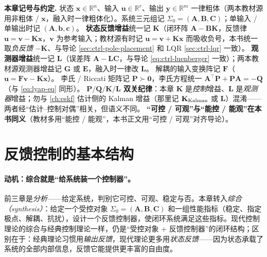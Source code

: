 \begin{note}
\textbf{本章记号与约定.}\;
状态 $\mathbf x\in\mathbb R^n$、输入 $\mathbf u\in\mathbb R^r$、输出 $\mathbf y\in\mathbb R^m$ 一律粗体（两本教材源用非粗体 / $\boldsymbol x$，融入时一律粗体化）。系统三元组记 $\Sigma_0=(\mathbf A,\mathbf B,\mathbf C)$；单输入 / 单输出时记 $(\mathbf A,\mathbf b,\mathbf c)$。
\textbf{状态反馈增益}统一记 $\mathbf K$（闭环阵 $\mathbf A-\mathbf B\mathbf K$，反馈律 $\mathbf u=\mathbf v-\mathbf K\mathbf x$，$\mathbf v$ 为参考输入；教材源有时记 $\mathbf u=\mathbf v+\mathbf K\mathbf x$ 而吸收负号，本书统一取\emph{负反馈} $-\mathbf K$、与导论 \cref{sec:ctrl-pole-placement} 和 LQR \cref{sec:ctrl-lqr} 一致）。
\textbf{观测器增益}统一记 $\mathbf L$（误差阵 $\mathbf A-\mathbf L\mathbf C$，与导论 \cref{eq:ctrl-luenberger} 一致）；两本教材源观测器增益记 $\mathbf G$ 或 $\mathbf E$，融入时一律改 $\mathbf L$。
解耦的输入变换阵记 $\mathbf F$（$\mathbf u=\mathbf F\mathbf v-\mathbf K\mathbf x$）。
李氏 / Riccati 矩阵记 $\mathbf P\succ\mathbf 0$，李氏方程统一 $\mathbf A^\top\mathbf P+\mathbf P\mathbf A=-\mathbf Q$（与 \cref{eq:lyap-eq} 同形）。
\textbf{$\mathbf P/\mathbf Q/\mathbf K/\mathbf L$ 双关纪律}：本章 $\mathbf K$ 是\emph{控制}增益、$\mathbf L$ 是\emph{观测器}增益；勿与 \cref{ch:eskf} 估计侧的 Kalman 增益（那里记 $\mathbf K_{\rm Kalman}$ 或 $\mathbf L$）混淆——两者经“估计--控制对偶”相关，但语义不同。
\textbf{“可控 / 可观”与“能控 / 能观”在本书同义}（教材多用“能控 / 能观”，本书正文用“可控 / 可观”对齐导论）。
\end{note}

\section{反馈控制的基本结构}
\label{sec:syn-feedback}

\paragraph{动机：综合就是“给系统装一个控制器”。}
前三章是\emph{分析}——给定系统，判别它可控、可观、稳定与否。本章转入\emph{综合（synthesis）}：给定一个受控对象 $\Sigma_0=(\mathbf A,\mathbf B,\mathbf C)$ 和一组性能指标（稳定、指定极点、解耦、抗扰），设计一个反馈控制器，使闭环系统满足这些指标\cite{liubao2006modern}。现代控制理论的综合与经典控制理论一样，仍是“受控对象 + 反馈控制器”的闭环结构；区别在于：经典理论习惯用\emph{输出反馈}，现代理论更多用\emph{状态反馈}——因为状态承载了系统的全部内部信息，反馈它能提供更丰富的自由度。

